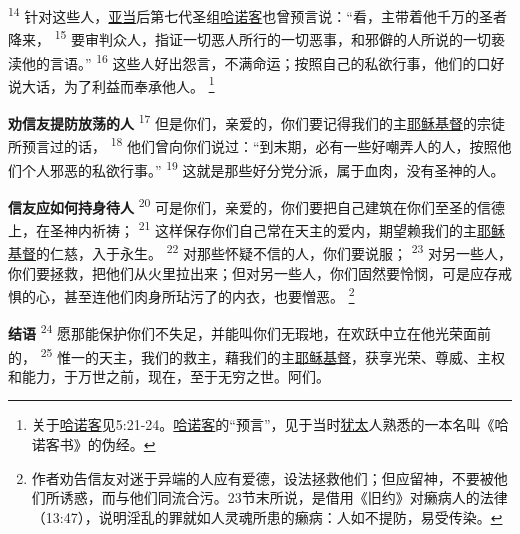 \textsuperscript{14}
针对这些人，\uline{亚当}后第七代圣组\uline{哈诺客}也曾预言说：“看，主带着他千万的圣者降来，
\textsuperscript{15}
要审判众人，指证一切恶人所行的一切恶事，和邪僻的人所说的一切亵渎他的言语。”
\textsuperscript{16}
这些人好出怨言，不满命运；按照自己的私欲行事，他们的口好说大话，为了利益而奉承他人。
\footnote{关于\uline{哈诺客}见5:21-24。\uline{哈诺客}的“预言”，见于当时\uline{犹太}人熟悉的一本名叫《哈诺客书》的伪经。}

\textbf{劝信友提防放荡的人\quad}
\textsuperscript{17}
但是你们，亲爱的，你们要记得我们的主\uline{耶稣}\uline{基督}的宗徒所预言过的话，
\textsuperscript{18}
他们曾向你们说过：“到末期，必有一些好嘲弄人的人，按照他们个人邪恶的私欲行事。”
\textsuperscript{19}
这就是那些好分党分派，属于血肉，没有圣神的人。

\textbf{信友应如何持身待人\quad}
\textsuperscript{20}
可是你们，亲爱的，你们要把自己建筑在你们至圣的信德上，在圣神内祈祷；
\textsuperscript{21}
这样保存你们自己常在天主的爱内，期望赖我们的主\uline{耶稣}\uline{基督}的仁慈，入于永生。
\textsuperscript{22}
对那些怀疑不信的人，你们要说服；
\textsuperscript{23}
对另一些人，你们要拯救，把他们从火里拉出来；但对另一些人，你们固然要怜悯，可是应存戒惧的心，甚至连他们肉身所玷污了的内衣，也要憎恶。
\footnote{作者劝告信友对迷于异端的人应有爱德，设法拯救他们；但应留神，不要被他们所诱惑，而与他们同流合污。23节末所说，是借用《旧约》对癞病人的法律（13:47），说明淫乱的罪就如人灵魂所患的癞病：人如不提防，易受传染。}

\textbf{结语\quad}
\textsuperscript{24}
愿那能保护你们不失足，并能叫你们无瑕地，在欢跃中立在他光荣面前的，
\textsuperscript{25}
惟一的天主，我们的救主，藉我们的主\uline{耶稣}\uline{基督}，获享光荣、尊威、主权和能力，于万世之前，现在，至于无穷之世。阿们。
